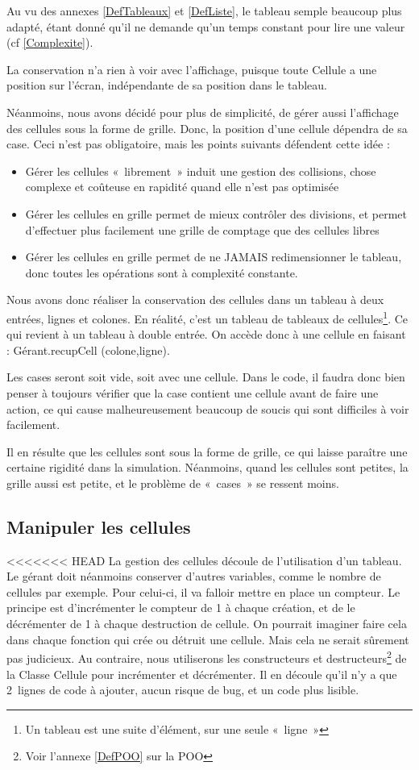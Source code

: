 Au vu des annexes \ref{DefTableaux} et \ref{DefListe}, le tableau semple beaucoup plus adapté, étant donné qu'il ne demande qu'un temps constant pour lire une valeur (cf \ref{Complexite}).

La conservation n'a rien à voir avec l'affichage, puisque toute Cellule a une position sur l'écran, indépendante de sa position dans le tableau.

Néanmoins, nous avons décidé pour plus de simplicité, de gérer aussi l'affichage des cellules sous la forme de grille. Donc, la position d'une cellule dépendra de sa case. Ceci n'est pas obligatoire, mais les points suivants défendent cette idée : 
\begin{itemize}
	\item Gérer les cellules «~librement~» induit une gestion des collisions, chose complexe et coûteuse en rapidité quand elle n'est pas optimisée
	\item Gérer les cellules en grille permet de mieux contrôler des divisions, et permet d'effectuer plus facilement une grille de comptage que des cellules libres 
	\item Gérer les cellules en grille permet de ne JAMAIS redimensionner le tableau, donc 
	toutes les opérations sont à complexité constante.
\end{itemize}

Nous avons donc réaliser la conservation des cellules dans un tableau à deux entrées, lignes et colones. En réalité, c'est un tableau de tableaux de cellules\footnote{Un tableau est une suite d'élément, sur une seule «~ligne~»}. Ce qui revient à un tableau à double entrée. On accède donc à une cellule en faisant : Gérant.recupCell (colone,ligne).

Les cases seront soit vide, soit avec une cellule. Dans le code, il faudra donc bien penser à toujours vérifier que la case contient une cellule avant de faire une action, ce qui cause malheureusement beaucoup de soucis qui sont difficiles à voir facilement.

Il en résulte que les cellules sont sous la forme de grille, ce qui laisse paraître une certaine rigidité dans la simulation. Néanmoins, quand les cellules sont petites, la grille aussi est petite, et le problème de «~cases~» se ressent moins.

\subsection{Manipuler les cellules}
<<<<<<< HEAD
	La gestion des cellules découle de l'utilisation d'un tableau. Le gérant doit néanmoins conserver d'autres variables, comme le nombre de cellules par exemple. Pour celui-ci, il va falloir mettre en place un compteur.
	Le principe est d'incrémenter le compteur de 1 à chaque création, et de le décrémenter de 1 à chaque destruction de cellule. On pourrait imaginer faire cela dans chaque fonction qui crée ou détruit une cellule. Mais cela ne serait sûrement pas judicieux. Au contraire, nous utiliserons les constructeurs et destructeurs\footnote{Voir l'annexe \ref{DefPOO} sur la POO} de la Classe Cellule pour incrémenter et décrémenter. Il en découle qu'il n'y a que 2 lignes de code à ajouter, aucun risque de bug, et un code plus lisible.
	
